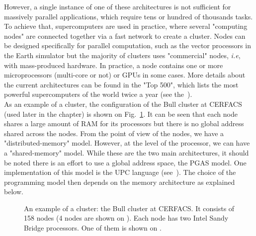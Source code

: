 %
However, a single instance of one of these architectures is not sufficient for
massively parallel applications, which require tens or hundred of thousands
tasks. To achieve that, supercomputers are used in practice, where
several "computing nodes" are connected together via a fast network to create a cluster.
Nodes can be designed specifically for parallel computation, such as the vector
processors in the Earth simulator but the majority of clusters uses
"commercial" nodes, \textit{i.e}, with mass-produced hardware. In practice, a
node contains one or more microprocessors (multi-core or not) or GPUs in some
cases. More details about the current architectures can be found in the "Top
500", which lists the most powerful supercomputers of the world twice a year
(see the~).\\
As an example of a cluster, the configuration of the Bull cluster at CERFACS
(used later in the chapter) is shown on Fig.~\ref{fig:bull_cluster}. It can be
seen that each node shares a large amount of RAM for its processors but there is
no global address shared across the nodes. From the point of view of the nodes,
we have a "distributed-memory" model. However, at the level of the processor, we
can have a "shared-memory" model.  While these are the two main architectures,
it should be noted there is an effort to use a global address space, the
\gls{PGAS} model. One implementation of this model is the \gls{UPC} language
(see~\cite{Carlson1999}).  The choice of the programming model then depends on
the memory architecture as explained below.

\begin{figure}
  \hfill
  \caption{An example of a cluster: the Bull cluster at CERFACS. It consists of
  158 nodes (4 nodes are shown on ). Each node has
  two Intel Sandy Bridge processors. One of them is shown on
  .}
  \label{fig:bull_cluster}
\end{figure}

